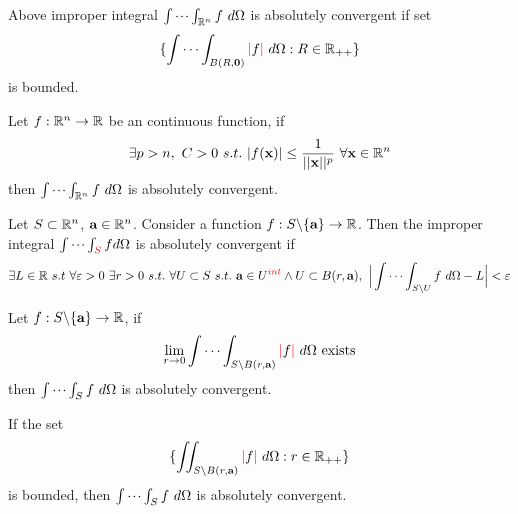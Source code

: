 \documentclass[11pt]{article}
\begin{document}
				\begin{corollary}[Equivalence]
					Above improper integral $\idotsint_{\R^n}f\ d\Omega$ is absolutely convergent if set
					\begin{equation}
						\{\idotsint_{B(R, \ve{0})}\red{|}f\red{|}\ d\Omega: R \in \R_{++}\}
					\end{equation}
					is bounded.
				\end{corollary}
				
				\begin{corollary}
					Let $f: \mathbb{R}^n \to \mathbb{R}$ be an continuous function, if 
					\begin{equation}
						\exists p > n,\ C > 0\ s.t.\ |f(\ve{x})| \leq \frac{1}{\norm{\ve{x}}^p}\ \forall \ve{x} \in \R^n
					\end{equation}
					then $\idotsint_{\R^n}f\ d\Omega$ is absolutely convergent.
				\end{corollary}
	
				\begin{definition}
					Let $S \subset \mathbb{R}^n$, $\textbf{a} \in \mathbb{R}^n$. Consider a function $f: S \backslash \{\textbf{a}\} \to \mathbb{R}$. Then the improper integral $\idotsint_{\textcolor{red}{S}}f d\Omega$ is absolutely convergent if 
					\begin{equation}
						\exists L \in \mathbb{R}\ s.t\ \forall \varepsilon > 0\ \exists r > 0\ s.t.\ \forall U \subset S\ s.t.\ \textbf{a} \in U^{\textcolor{red}{int}} \land U \subset B(r, \textbf{a}),\ \Big|
							\idotsint_{S \backslash U}f\ d\Omega - L
						\Big| < \varepsilon
					\end{equation}
				\end{definition}
				
				\begin{theorem}
					Let $f: S\backslash \{\textbf{a}\} \to \mathbb{R}$, if
					\begin{equation}
						\lim_{r\to 0}\idotsint_{S \backslash B(r, \textbf{a})}\textcolor{red}{|}f\textcolor{red}{|}\ d\Omega \text{{ exists}}
					\end{equation}
					then $\idotsint_S f\ d\Omega$ is absolutely convergent.
				\end{theorem}
				
				\begin{corollary}[Equivalence]
					If the set
					\begin{equation}
						\{\iint_{S \backslash B(r, \textbf{a})} \textcolor{red}{|}f\textcolor{red}{|}\ d\Omega: r \in \mathbb{R}_{++}\}
					\end{equation}
					is bounded, then $\idotsint_S f\ d\Omega$ is absolutely convergent.
				\end{corollary}
				
\end{document}
